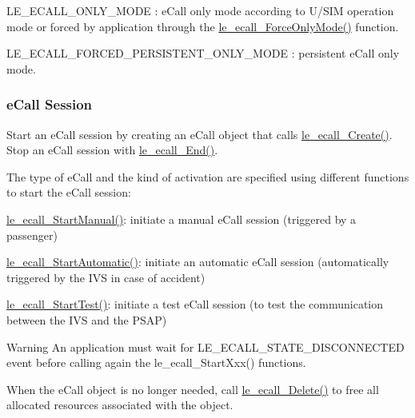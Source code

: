 \begin{DoxyItemize}
\begin{DoxyItemize}
\item {\ttfamily L\+E\+\_\+\+E\+C\+A\+L\+L\+\_\+\+O\+N\+L\+Y\+\_\+\+M\+O\+D\+E} \+: e\+Call only mode according to U/\+S\+I\+M operation mode or forced by application through the \hyperlink{le__ecall__interface_8h_a042d52c84b5b679ab32dd814c5b0be9e}{le\+\_\+ecall\+\_\+\+Force\+Only\+Mode()} function.
\item {\ttfamily L\+E\+\_\+\+E\+C\+A\+L\+L\+\_\+\+F\+O\+R\+C\+E\+D\+\_\+\+P\+E\+R\+S\+I\+S\+T\+E\+N\+T\+\_\+\+O\+N\+L\+Y\+\_\+\+M\+O\+D\+E} \+: persistent e\+Call only mode.
\end{DoxyItemize}
\end{DoxyItemize}\hypertarget{c_ecall_le_ecall_session}{}\subsubsection{e\+Call Session}\label{c_ecall_le_ecall_session}
Start an e\+Call session by creating an e\+Call object that calls \hyperlink{le__ecall__interface_8h_aad7fa3b34d9d72a2f1d4baa681ba25cc}{le\+\_\+ecall\+\_\+\+Create()}. Stop an e\+Call session with \hyperlink{le__ecall__interface_8h_a85800c86f9709fb7baa7219cc762181c}{le\+\_\+ecall\+\_\+\+End()}.

The type of e\+Call and the kind of activation are specified using different functions to start the e\+Call session\+:
\begin{DoxyItemize}
\item \hyperlink{le__ecall__interface_8h_ab106c3ca87fc8dd8239d2849df932122}{le\+\_\+ecall\+\_\+\+Start\+Manual()}\+: initiate a manual e\+Call session (triggered by a passenger)
\item \hyperlink{le__ecall__interface_8h_aa25256eeacefcf00c14763ef294c7667}{le\+\_\+ecall\+\_\+\+Start\+Automatic()}\+: initiate an automatic e\+Call session (automatically triggered by the I\+V\+S in case of accident)
\item \hyperlink{le__ecall__interface_8h_aa5d23a1bea370b1ae29fc52d7a89d947}{le\+\_\+ecall\+\_\+\+Start\+Test()}\+: initiate a test e\+Call session (to test the communication between the I\+V\+S and the P\+S\+A\+P)
\end{DoxyItemize}

\begin{DoxyWarning}{Warning}
An application must wait for {\ttfamily L\+E\+\_\+\+E\+C\+A\+L\+L\+\_\+\+S\+T\+A\+T\+E\+\_\+\+D\+I\+S\+C\+O\+N\+N\+E\+C\+T\+E\+D} event before calling again the {\ttfamily le\+\_\+ecall\+\_\+\+Start\+Xxx()} functions.
\end{DoxyWarning}
When the e\+Call object is no longer needed, call \hyperlink{le__ecall__interface_8h_af1221deb68c46912748f65505b3e4919}{le\+\_\+ecall\+\_\+\+Delete()} to free all allocated resources associated with the object.

